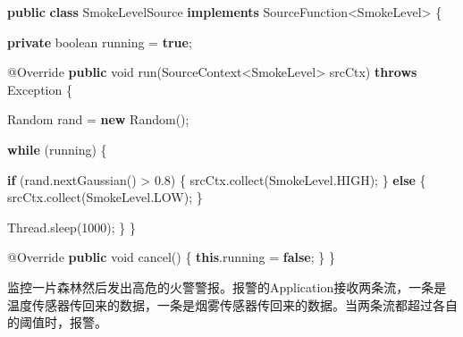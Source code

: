 \documentclass[cn,11pt,chinese]{elegantbook}
\newenvironment{Shaded}{}{}
\newcommand{\AttributeTok}[1]{\textcolor[rgb]{0.49,0.56,0.16}{#1}}
\newcommand{\BuiltInTok}[1]{#1}
\newcommand{\DataTypeTok}[1]{\textcolor[rgb]{0.56,0.13,0.00}{#1}}
\newcommand{\DecValTok}[1]{\textcolor[rgb]{0.25,0.63,0.44}{#1}}
\newcommand{\FloatTok}[1]{\textcolor[rgb]{0.25,0.63,0.44}{#1}}
\newcommand{\FunctionTok}[1]{\textcolor[rgb]{0.02,0.16,0.49}{#1}}
\newcommand{\KeywordTok}[1]{\textcolor[rgb]{0.00,0.44,0.13}{\textbf{#1}}}
\newcommand{\NormalTok}[1]{#1}
\begin{document}
\begin{Shaded}
\begin{Highlighting}[]
\KeywordTok{public} \KeywordTok{class}\NormalTok{ SmokeLevelSource }\KeywordTok{implements}\NormalTok{ SourceFunction\textless{}SmokeLevel\textgreater{} \{}

    \KeywordTok{private} \DataTypeTok{boolean}\NormalTok{ running = }\KeywordTok{true}\NormalTok{;}

    \AttributeTok{@Override}
    \KeywordTok{public} \DataTypeTok{void} \FunctionTok{run}\NormalTok{(SourceContext\textless{}SmokeLevel\textgreater{} srcCtx) }\KeywordTok{throws} \BuiltInTok{Exception}\NormalTok{ \{}

        \BuiltInTok{Random}\NormalTok{ rand = }\KeywordTok{new} \BuiltInTok{Random}\NormalTok{();}

        \KeywordTok{while}\NormalTok{ (running) \{}

            \KeywordTok{if}\NormalTok{ (rand.}\FunctionTok{nextGaussian}\NormalTok{() \textgreater{} }\FloatTok{0.}\DecValTok{8}\NormalTok{) \{}
\NormalTok{                srcCtx.}\FunctionTok{collect}\NormalTok{(SmokeLevel.}\FunctionTok{HIGH}\NormalTok{);}
\NormalTok{            \} }\KeywordTok{else}\NormalTok{ \{}
\NormalTok{                srcCtx.}\FunctionTok{collect}\NormalTok{(SmokeLevel.}\FunctionTok{LOW}\NormalTok{);}
\NormalTok{            \}}

            \BuiltInTok{Thread}\NormalTok{.}\FunctionTok{sleep}\NormalTok{(}\DecValTok{1000}\NormalTok{);}
\NormalTok{        \}}
\NormalTok{    \}}

    \AttributeTok{@Override}
    \KeywordTok{public} \DataTypeTok{void} \FunctionTok{cancel}\NormalTok{() \{}
        \KeywordTok{this}\NormalTok{.}\FunctionTok{running}\NormalTok{ = }\KeywordTok{false}\NormalTok{;}
\NormalTok{    \}}
\NormalTok{\}}
\end{Highlighting}
\end{Shaded}

监控一片森林然后发出高危的火警警报。报警的Application接收两条流，一条是温度传感器传回来的数据，一条是烟雾传感器传回来的数据。当两条流都超过各自的阈值时，报警。
\end{document}
